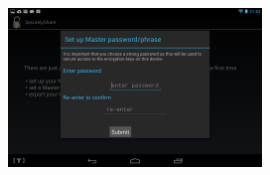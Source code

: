 \begin{figure}[h!]
    \centering
    \includegraphics[width=0.6\textwidth]{Setup}                                                                                                                                                                                                                                                                                                                                                                                                                                                                                                                                                                                                                                                                                                                                                                                                                                                                                                                                                                                                                                                                                                                                                                                                                                                                                                                                                                                                                                                                                                                                                                                                                                                                                                                                                                                                                                                                                                                                                                                                                                                                                                                                                                                                                                                                                                                                                                                                                                                                                                                                                                                                                                                                                                                                                                
\end{figure}
